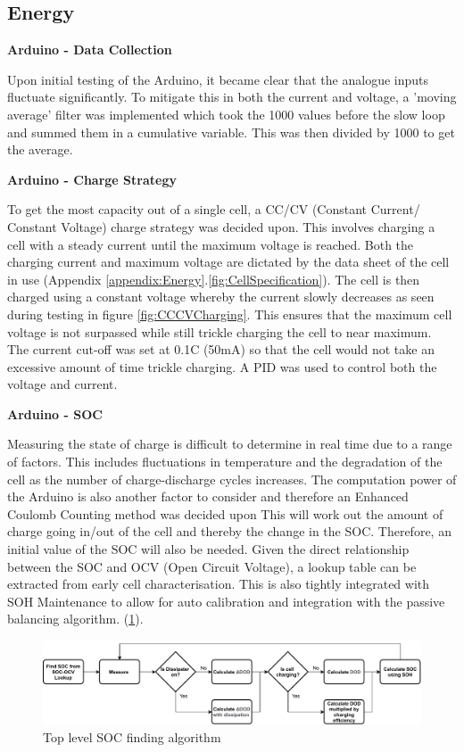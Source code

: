 \documentclass[10pt,twoside]{article}
\begin{document}
\subsection{Energy}
\textbf{Arduino - Data Collection}

Upon initial testing of the Arduino, it became clear that the analogue inputs fluctuate significantly. To mitigate this in both the current and voltage, a 'moving average' filter was implemented which took the 1000 values before the slow loop and summed them in a cumulative variable. This was then divided by 1000 to get the average.

\textbf{Arduino - Charge Strategy}

To get the most capacity out of a single cell, a CC/CV (Constant Current/ Constant Voltage) charge strategy was decided upon. This involves charging a cell with a steady current until the maximum voltage is reached. Both the charging current and maximum voltage are dictated by the data sheet of the cell in use (Appendix \ref{appendix:Energy}.\ref{fig:CellSpecification}). The cell is then charged using a constant voltage whereby the current slowly decreases as seen during testing in figure \ref{fig:CCCVCharging}. This ensures that the maximum cell voltage is not surpassed while still trickle charging the cell to near maximum. The current cut-off was set at 0.1C (50mA) so that the cell would not take an excessive amount of time trickle charging. A PID was used to control both the voltage and current.

\textbf{Arduino - SOC}

Measuring the state of charge is difficult to determine in real time due to a range of factors. This includes fluctuations in temperature and the degradation of the cell as the number of charge-discharge cycles increases. The computation power of the Arduino is also another factor to consider and therefore an Enhanced Coulomb Counting method \cite{Ng2009EnhancedBatteries} was decided upon This will work out the amount of charge going in/out of the cell and thereby the change in the SOC. Therefore, an initial value of the SOC will also be needed. Given the direct relationship between the SOC and OCV (Open Circuit Voltage), a lookup table can be extracted from early cell characterisation. This is also tightly integrated with SOH Maintenance to allow for auto calibration and integration with the passive balancing algorithm. (\ref{fig:SOCFlow}). 

\begin{figure}[hbt]
    \centering
    \includegraphics[scale = 0.7]{ColoumbCounting (2).pdf}
    \caption{Top level SOC finding algorithm}
    \label{fig:SOCFlow}
\end{figure}
\end{document}
